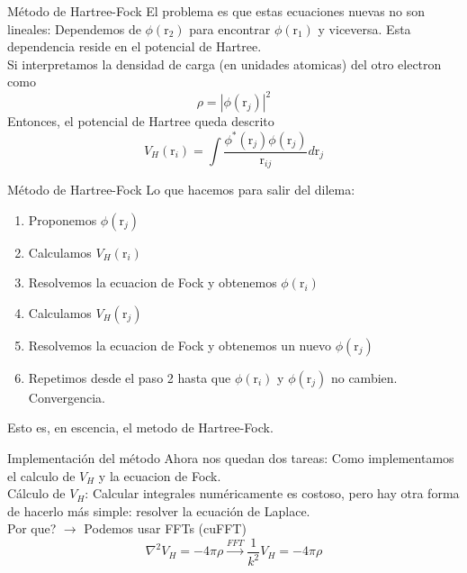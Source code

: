 \documentclass{beamer}
\begin{document}
\begin{frame}{Método de Hartree-Fock}
    El problema es que estas ecuaciones nuevas no son lineales: Dependemos de $\phi(\text{r}_2)$ para encontrar $\phi(\text{r}_1)$ y viceversa. Esta dependencia reside en el potencial de Hartree. \\\vspace{4mm}
    Si interpretamos la densidad de carga (en unidades atomicas) del otro electron como 
    \begin{equation}
        \rho = |\phi(\text{r}_j)|^2
    \end{equation}
    Entonces, el potencial de Hartree queda descrito
    \begin{equation}
        V_H(\text{r}_i) = \int \frac{\phi^*(\text{r}_j)\phi(\text{r}_j)}{\text{r}_{ij}}d\text{r}_j
    \end{equation}
\end{frame}

\begin{frame}{Método de Hartree-Fock}
    Lo que hacemos para salir del dilema:
    \begin{enumerate}[1.-]
        \item Proponemos $\phi(\text{r}_j)$
        \item Calculamos $V_H(\text{r}_i)$
        \item Resolvemos la ecuacion de Fock y obtenemos $\phi(\text{r}_i)$
        \item Calculamos $V_H(\text{r}_j)$
        \item Resolvemos la ecuacion de Fock y obtenemos un nuevo $\phi(\text{r}_j)$
        \item Repetimos desde el paso 2 hasta que $\phi(\text{r}_i)$ y $\phi(\text{r}_j)$ no cambien. \alert{Convergencia.}
    \end{enumerate}
    Esto es, en escencia, el metodo de Hartree-Fock.\\\vspace{4mm}
\end{frame}

\begin{frame}{Implementación del método}
    Ahora nos quedan dos tareas: Como implementamos el calculo de $V_H$ y la ecuacion de Fock. \\\vspace{4mm}
    Cálculo de $V_H$: Calcular integrales numéricamente es costoso, pero hay otra forma de hacerlo más simple: \alert{resolver la ecuación de Laplace.}\\
    Por que? $\to$ Podemos usar FFTs (cuFFT)
    \begin{equation}
        \nabla^2 V_H = -4\pi\rho \xrightarrow{FFT} \frac{1}{k^2}V_H = -4\pi\rho
    \end{equation}
\end{frame}
\end{document}
